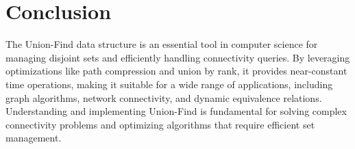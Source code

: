 \section*{Conclusion}

The Union-Find data structure is an essential tool in computer science for managing disjoint sets and efficiently handling connectivity queries. By leveraging optimizations like path compression and union by rank, it provides near-constant time operations, making it suitable for a wide range of applications, including graph algorithms, network connectivity, and dynamic equivalence relations. Understanding and implementing Union-Find is fundamental for solving complex connectivity problems and optimizing algorithms that require efficient set management.

\printindex

% 
% 
% 
% 